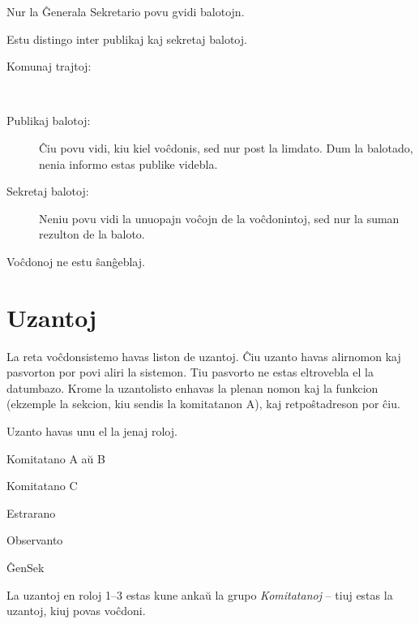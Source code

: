 \documentclass[draft]{scrartcl}
\newenvironment{enumerate*}{%
  \begin{enumerate}%
  \setlength{\itemsep}{0pt}%
  \setlength{\parsep}{0pt}%
  \setlength{\parskip}{2pt plus 1pt}
  \setlength{\topsep}{1pt}%
  \setlength{\partopsep}{0pt}%
}{%
    \end{enumerate}%
}
\begin{document}
\begin{enumerate*}
\item Nur la Ĝenerala Sekretario povu gvidi balotojn.
\item Estu distingo inter publikaj kaj sekretaj balotoj.
  \begin{description}
  \item[Komunaj trajtoj:] ~
  \item [Publikaj balotoj:]
    Ĉiu povu vidi, kiu kiel voĉdonis, sed nur post la limdato. Dum la
    balotado, nenia informo estas publike videbla.

  \item [Sekretaj balotoj:]
    Neniu povu vidi la unuopajn voĉojn de la voĉdonintoj, sed nur la
    suman rezulton de la baloto.
  \end{description}
\item Voĉdonoj ne estu ŝanĝeblaj.
\end{enumerate*}

\section{Uzantoj}
La reta voĉdonsistemo havas liston de uzantoj.
Ĉiu uzanto havas alirnomon kaj pasvorton por povi aliri la sistemon.
Tiu pasvorto ne estas eltrovebla el la datumbazo.
Krome la uzantolisto enhavas la plenan nomon kaj la funkcion
(ekzemple la sekcion, kiu sendis la komitatanon A), kaj retpoŝtadreson
por ĉiu.

Uzanto havas unu el la jenaj roloj.
\begin{enumerate*}
\item Komitatano A aŭ B
\item Komitatano C
\item Estrarano
\item Observanto
\item ĜenSek
\end{enumerate*}
La uzantoj en roloj 1--3 estas kune ankaŭ la grupo \emph{Komitatanoj} -- tiuj
estas la uzantoj, kiuj povas voĉdoni.
\end{document}
